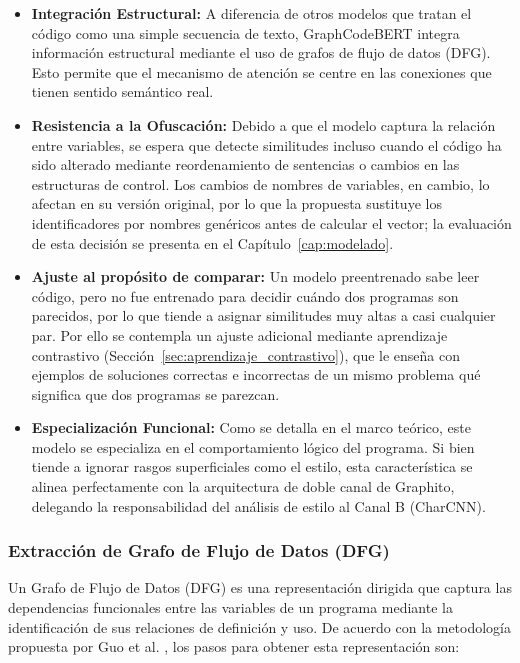 \begin{itemize}
	\item \textbf{Integración Estructural:} A diferencia de otros modelos que tratan el código como una simple secuencia de texto, GraphCodeBERT integra información estructural mediante el uso de grafos de flujo de datos (DFG). Esto permite que el mecanismo de atención se centre en las conexiones que tienen sentido semántico real.
	\item \textbf{Resistencia a la Ofuscación:} Debido a que el modelo captura la relación entre variables, se espera que detecte similitudes incluso cuando el código ha sido alterado mediante reordenamiento de sentencias o cambios en las estructuras de control. Los cambios de nombres de variables, en cambio, lo afectan en su versión original, por lo que la propuesta sustituye los identificadores por nombres genéricos antes de calcular el vector; la evaluación de esta decisión se presenta en el Capítulo~\ref{cap:modelado}.
	\item \textbf{Ajuste al propósito de comparar:} Un modelo preentrenado sabe leer código, pero no fue entrenado para decidir cuándo dos programas son parecidos, por lo que tiende a asignar similitudes muy altas a casi cualquier par. Por ello se contempla un ajuste adicional mediante aprendizaje contrastivo (Sección~\ref{sec:aprendizaje_contrastivo}), que le enseña con ejemplos de soluciones correctas e incorrectas de un mismo problema qué significa que dos programas se parezcan.
	\item \textbf{Especialización Funcional:} Como se detalla en el marco teórico, este modelo se especializa en el comportamiento lógico del programa. Si bien tiende a ignorar rasgos superficiales como el estilo, esta característica se alinea perfectamente con la arquitectura de doble canal de Graphito, delegando la responsabilidad del análisis de estilo al Canal B (CharCNN).
\end{itemize}



\subsubsection{Extracción de Grafo de Flujo de Datos (DFG)}

Un Grafo de Flujo de Datos (DFG) es una representación dirigida que captura las dependencias funcionales entre las variables de un programa mediante la identificación de sus relaciones de definición y uso. De acuerdo con la metodología propuesta por Guo et al. \cite{Guo2021GraphCodeBERT}, los pasos para obtener esta representación son:

